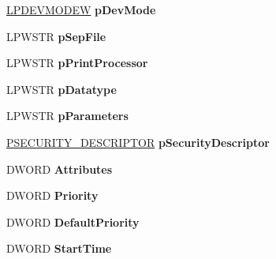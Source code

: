 \begin{DoxyCompactItemize}
\hyperlink{struct__devicemode_w}{L\+P\+D\+E\+V\+M\+O\+D\+EW} {\bfseries p\+Dev\+Mode}
\item 
\mbox{\label{struct___p_r_i_n_t_e_r___i_n_f_o__2_w_a29a9f24ce6c3cbf67e0f03e30eec4163}} 
L\+P\+W\+S\+TR {\bfseries p\+Sep\+File}
\item 
\mbox{\label{struct___p_r_i_n_t_e_r___i_n_f_o__2_w_a273801340696725994bedd3e98bd9d71}} 
L\+P\+W\+S\+TR {\bfseries p\+Print\+Processor}
\item 
\mbox{\label{struct___p_r_i_n_t_e_r___i_n_f_o__2_w_a499e12ff277979af26cdd80e74665646}} 
L\+P\+W\+S\+TR {\bfseries p\+Datatype}
\item 
\mbox{\label{struct___p_r_i_n_t_e_r___i_n_f_o__2_w_ad5a581a3cad47a1c159fe02ed281ff99}} 
L\+P\+W\+S\+TR {\bfseries p\+Parameters}
\item 
\mbox{\label{struct___p_r_i_n_t_e_r___i_n_f_o__2_w_ad513261c9394f081b3b64b94409b708f}} 
\hyperlink{struct___s_e_c_u_r_i_t_y___d_e_s_c_r_i_p_t_o_r}{P\+S\+E\+C\+U\+R\+I\+T\+Y\+\_\+\+D\+E\+S\+C\+R\+I\+P\+T\+OR} {\bfseries p\+Security\+Descriptor}
\item 
\mbox{\label{struct___p_r_i_n_t_e_r___i_n_f_o__2_w_ab11fbdabd7ed6f85645371381076cdf4}} 
D\+W\+O\+RD {\bfseries Attributes}
\item 
\mbox{\label{struct___p_r_i_n_t_e_r___i_n_f_o__2_w_a7d26e07fff0f853e12bc4146f78cd34b}} 
D\+W\+O\+RD {\bfseries Priority}
\item 
\mbox{\label{struct___p_r_i_n_t_e_r___i_n_f_o__2_w_a0e80801f70088e636b8730b1579b4fdf}} 
D\+W\+O\+RD {\bfseries Default\+Priority}
\item 
\mbox{\label{struct___p_r_i_n_t_e_r___i_n_f_o__2_w_a1bfd3ec857652a4393a953875a471fa8}} 
D\+W\+O\+RD {\bfseries Start\+Time}
\item 
\mbox{\label{struct___p_r_i_n_t_e_r___i_n_f_o__2_w_a30b7ecf95b034f3bdcc41d1c970444e9}} 

\end{DoxyCompactItemize}
